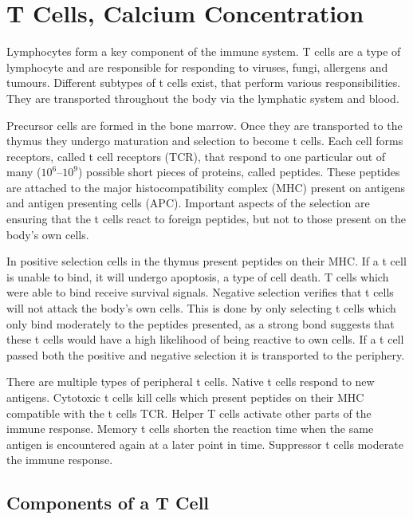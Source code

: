 \chapter{T Cells, Calcium Concentration}
\label{chapter:t-cell}

Lymphocytes form a key component of the immune system. T cells are a type of lymphocyte and are responsible for responding to viruses, fungi, allergens and tumours. Different subtypes of t cells exist, that perform various responsibilities. They are transported throughout the body via the lymphatic system and blood.\cite{Kumar2018}

Precursor cells are formed in the bone marrow. Once they are transported to the thymus they undergo maturation and selection to become t cells. Each cell forms receptors, called t cell receptors (TCR), that respond to one particular out of many ($10^6 – 10^9$) possible short pieces of proteins, called peptides. These peptides are attached to the major histocompatibility complex (MHC) present on antigens and antigen presenting cells (APC). Important aspects of the selection are ensuring that the t cells react to foreign peptides, but not to those present on the body's own cells.\cite{Ashby2024}

In positive selection cells in the thymus present peptides on their MHC. If a t cell is unable to bind, it will undergo apoptosis, a type of cell death. T cells which were able to bind receive survival signals. Negative selection verifies that t cells will not attack the body's own cells. This is done by only selecting t cells which only bind moderately to the peptides presented, as a strong bond suggests that these t cells would have a high likelihood of being reactive to own cells.\cite{Hagel2018} If a t cell passed both the positive and negative selection it is transported to the periphery.

There are multiple types of peripheral t cells. Native t cells respond to new antigens. Cytotoxic t cells kill cells which present peptides on their MHC compatible with the t cells TCR. Helper T cells activate other parts of the immune response. Memory t cells shorten the reaction time when the same antigen is encountered again at a later point in time. Suppressor t cells moderate the immune response.\cite{Ganong1997}

\section{Components of a T Cell}

